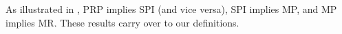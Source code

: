 

As illustrated in \cite{EPRINT:BRRS09}, PRP implies SPI (and vice versa), SPI implies MP, and MP implies MR. These results carry over to our definitions.